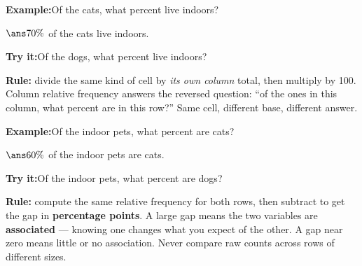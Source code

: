 \documentclass[12pt]{article}
\begin{document}
\begin{examplebox}
\textbf{Example:}\quad Of the cats, what percent live indoors?

$\ans{70\%}$ of the cats live indoors.
\end{examplebox}

\begin{tryitbox}
\textbf{Try it:}\quad Of the dogs, what percent live indoors?\\[2pt]
\end{tryitbox}


\begin{formulabox}
\textbf{Rule:} divide the same kind of cell by \emph{its own column} total,
then multiply by 100. Column relative frequency answers the reversed question:
``of the ones in this column, what percent are in this row?'' Same cell,
different base, different answer.
\end{formulabox}

\begin{examplebox}
\textbf{Example:}\quad Of the indoor pets, what percent are cats?

$\ans{60\%}$ of the indoor pets are cats.
\end{examplebox}

\begin{tryitbox}
\textbf{Try it:}\quad Of the indoor pets, what percent are dogs?\\[2pt]
\end{tryitbox}


\begin{formulabox}
\textbf{Rule:} compute the same relative frequency for both rows, then subtract
to get the gap in \textbf{percentage points}. A large gap means the two
variables are \textbf{associated} --- knowing one changes what you expect of the
other. A gap near zero means little or no association. Never compare raw counts
across rows of different sizes.
\end{formulabox}
\end{document}
